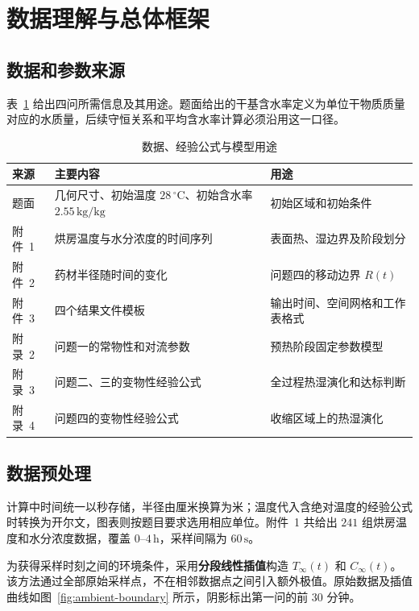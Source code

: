 \section{数据理解与总体框架}

\subsection{数据和参数来源}

表~\ref{tab:data-source} 给出四问所需信息及其用途。题面给出的干基含水率定义为单位干物质质量对应的水质量，后续守恒关系和平均含水率计算必须沿用这一口径。

\begin{table}[H]
  \centering
  \caption{数据、经验公式与模型用途}
  \label{tab:data-source}
  \begin{tabularx}{\textwidth}{p{}p{}X}
    \toprule
    来源 & 主要内容 & 用途 \\
    \midrule
    题面 & 几何尺寸、初始温度 $28\,{}^\circ\mathrm{C}$、初始含水率 $2.55\,\mathrm{kg/kg}$ & 初始区域和初始条件 \\
    附件~1 & 烘房温度与水分浓度的时间序列 & 表面热、湿边界及阶段划分 \\
    附件~2 & 药材半径随时间的变化 & 问题四的移动边界 $R(t)$ \\
    附件~3 & 四个结果文件模板 & 输出时间、空间网格和工作表格式 \\
    附录~2 & 问题一的常物性和对流参数 & 预热阶段固定参数模型 \\
    附录~3 & 问题二、三的变物性经验公式 & 全过程热湿演化和达标判断 \\
    附录~4 & 问题四的变物性经验公式 & 收缩区域上的热湿演化 \\
    \bottomrule
  \end{tabularx}
\end{table}

\subsection{数据预处理}

计算中时间统一以秒存储，半径由厘米换算为米；温度代入含绝对温度的经验公式时转换为开尔文，图表则按题目要求选用相应单位。附件~1 共给出 $241$ 组烘房温度和水分浓度数据，覆盖 $0$--$4\,\mathrm h$，采样间隔为 $60\,\mathrm s$。

为获得采样时刻之间的环境条件，采用\textbf{分段线性插值}构造 $T_\infty(t)$ 和 $C_\infty(t)$。该方法通过全部原始采样点，不在相邻数据点之间引入额外极值。原始数据及插值曲线如图~\ref{fig:ambient-boundary} 所示，阴影标出第一问的前 $30$ 分钟。

